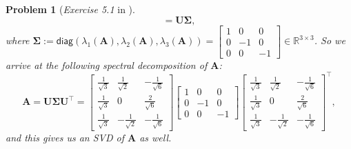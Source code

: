 \documentclass[11pt]{article}
\newtheorem{problem}{Problem}
\begin{document}
\begin{problem} [\emph{Exercise 5.1} in \cite{calafiore2014optimization}]
{\begin{equation}
    = \mathbf{U} \mathbf{\Sigma},
\end{equation}
where $\mathbf{\Sigma} := \textsf{diag} \left( \lambda_1 (\mathbf{A}), \lambda_2 (\mathbf{A}), \lambda_3 (\mathbf{A}) \right) =
\begin{bmatrix}
    1 & 0 & 0 \\ 0 & -1 & 0 \\ 0 & 0 & -1
\end{bmatrix} \in \mathbb{R}^{3 \times 3}$. So we arrive at the following spectral decomposition of $\mathbf{A}$:
\begin{equation*}
    \mathbf{A} = \mathbf{U} \mathbf{\Sigma} \mathbf{U}^{\top} 
    =
    \begin{bmatrix}
        \frac{1}{\sqrt{3}} & \frac{1}{\sqrt{2}} & - \frac{1}{\sqrt{6}} \\
        \frac{1}{\sqrt{3}} & 0 & \frac{2}{\sqrt{6}} \\
        \frac{1}{\sqrt{3}} & - \frac{1}{\sqrt{2}} & - \frac{1}{\sqrt{6}}
    \end{bmatrix}
    \begin{bmatrix}
        1 & 0 & 0 \\ 0 & -1 & 0 \\ 0 & 0 & -1
    \end{bmatrix}
    \begin{bmatrix}
        \frac{1}{\sqrt{3}} & \frac{1}{\sqrt{2}} & - \frac{1}{\sqrt{6}} \\
        \frac{1}{\sqrt{3}} & 0 & \frac{2}{\sqrt{6}} \\
        \frac{1}{\sqrt{3}} & - \frac{1}{\sqrt{2}} & - \frac{1}{\sqrt{6}}
    \end{bmatrix}^{\top},
\end{equation*}
and this gives us an \textsf{SVD} of $\mathbf{A}$ as well.
}
\end{problem}
\end{document}
